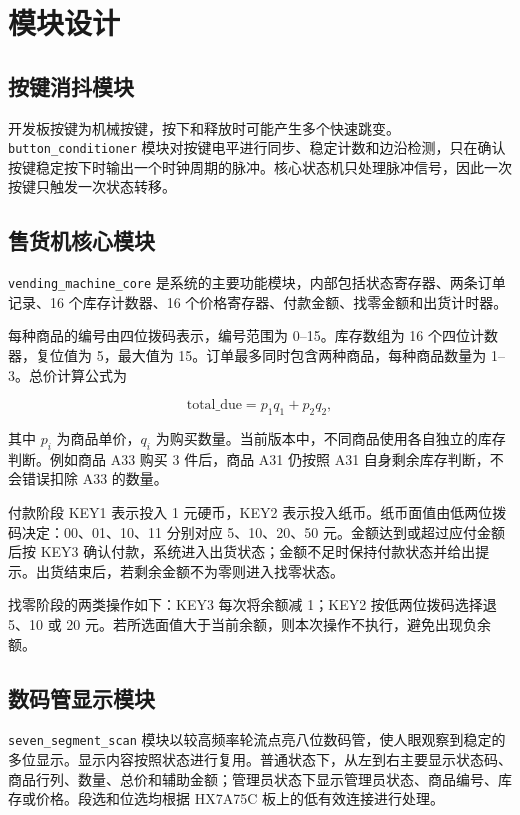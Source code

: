 \documentclass[UTF8,a4paper,12pt]{ctexart}
\begin{document}
\section{模块设计}

\subsection{按键消抖模块}

开发板按键为机械按键，按下和释放时可能产生多个快速跳变。\texttt{button\_conditioner} 模块对按键电平进行同步、稳定计数和边沿检测，只在确认按键稳定按下时输出一个时钟周期的脉冲。核心状态机只处理脉冲信号，因此一次按键只触发一次状态转移。

\subsection{售货机核心模块}

\texttt{vending\_machine\_core} 是系统的主要功能模块，内部包括状态寄存器、两条订单记录、16 个库存计数器、16 个价格寄存器、付款金额、找零金额和出货计时器。

每种商品的编号由四位拨码表示，编号范围为 0--15。库存数组为 16 个四位计数器，复位值为 5，最大值为 15。订单最多同时包含两种商品，每种商品数量为 1--3。总价计算公式为

\begin{equation}
  \mathrm{total\_due} = p_1q_1 + p_2q_2,
\end{equation}

其中 $p_i$ 为商品单价，$q_i$ 为购买数量。当前版本中，不同商品使用各自独立的库存判断。例如商品 A33 购买 3 件后，商品 A31 仍按照 A31 自身剩余库存判断，不会错误扣除 A33 的数量。

付款阶段 KEY1 表示投入 1 元硬币，KEY2 表示投入纸币。纸币面值由低两位拨码决定：00、01、10、11 分别对应 5、10、20、50 元。金额达到或超过应付金额后按 KEY3 确认付款，系统进入出货状态；金额不足时保持付款状态并给出提示。出货结束后，若剩余金额不为零则进入找零状态。

找零阶段的两类操作如下：KEY3 每次将余额减 1；KEY2 按低两位拨码选择退 5、10 或 20 元。若所选面值大于当前余额，则本次操作不执行，避免出现负余额。

\subsection{数码管显示模块}

\texttt{seven\_segment\_scan} 模块以较高频率轮流点亮八位数码管，使人眼观察到稳定的多位显示。显示内容按照状态进行复用。普通状态下，从左到右主要显示状态码、商品行列、数量、总价和辅助金额；管理员状态下显示管理员状态、商品编号、库存或价格。段选和位选均根据 HX7A75C 板上的低有效连接进行处理。
\end{document}
